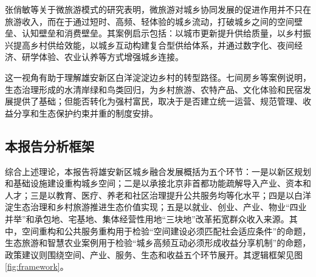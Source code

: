 \documentclass[UTF8,zihao=-4]{ctexart}
\begin{document}
张俏敏等关于微旅游模式的研究表明，微旅游对城乡协同发展的促进作用并不只在旅游收入，而在于通过短时、高频、轻体验的城乡流动，打破城乡之间的空间壁垒、认知壁垒和消费壁垒。其案例启示包括：以城市更新提升供给质量，以乡村振兴提高乡村供给效能，以城乡互动构建复合型供给体系，并通过数字化、夜间经济、研学体验、农业认养等方式增强城乡连接。

这一视角有助于理解雄安新区白洋淀淀边乡村的转型路径。七间房乡等案例说明，生态治理形成的水清岸绿和鸟类回归，为乡村旅游、农特产品、文化体验和民宿发展提供了基础；但能否转化为强村富民，取决于是否建立统一运营、规范管理、收益分享和生态保护约束并重的制度安排。

\subsection{本报告分析框架}

综合上述理论，本报告将雄安新区城乡融合发展概括为五个环节：一是以新区规划和基础设施建设重构城乡空间；二是以承接北京非首都功能疏解导入产业、资本和人才；三是以教育、医疗、养老和社区治理提升公共服务均等化水平；四是以白洋淀生态治理和乡村旅游推进生态价值实现；五是以就业、创业、产业、物业“四业并举”和承包地、宅基地、集体经营性用地“三块地”改革拓宽群众收入来源。其中，空间重构和公共服务重构用于检验“空间建设必须匹配社会适应条件”的命题，生态旅游和智慧农业案例用于检验“城乡高频互动必须形成收益分享机制”的命题，政策建议则围绕空间、产业、服务、生态和收益五个环节展开。其逻辑框架见图\ref{fig:framework}。
\end{document}
